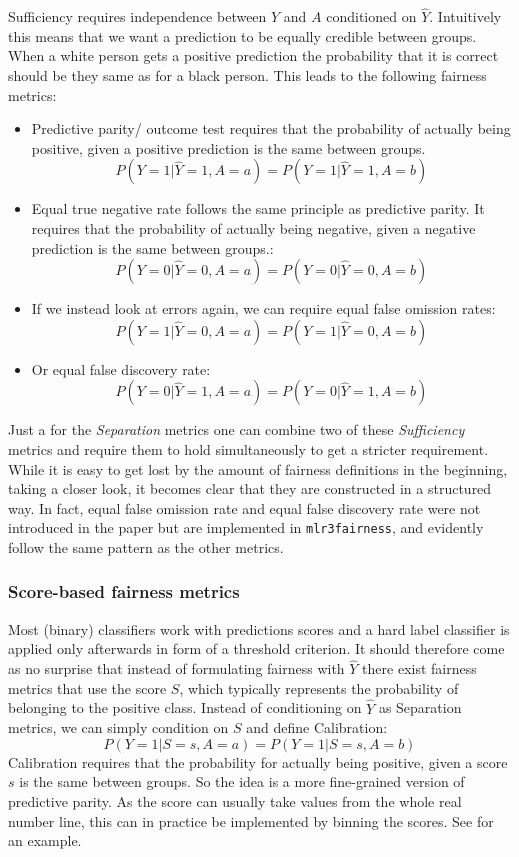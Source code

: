 Sufficiency requires independence between $Y$ and $A$ conditioned on $\hat{Y}$. Intuitively this means that we want a prediction to be equally credible between groups. When a white person gets a positive prediction the probability that it is correct should be they same as for a black person. This leads to the following fairness metrics:
\begin{itemize}
    \item Predictive parity/ outcome test requires that the probability of actually being positive, given a positive prediction is the same between groups. $$P(Y = 1 | \hat{Y} = 1, A = a) = P(Y = 1 | \hat{Y} = 1, A = b)$$
    \item Equal true negative rate follows the same principle as predictive parity. It requires that the probability of actually being negative, given a negative prediction is the same between groups.: $$P(Y = 0 | \hat{Y} = 0, A = a) = P(Y = 0 | \hat{Y} = 0, A = b)$$
    \item If we instead look at errors again, we can require equal false omission rates: $$P(Y = 1 | \hat{Y} = 0, A = a) = P(Y = 1 | \hat{Y} = 0, A = b)$$
    \item Or equal false discovery rate: $$P(Y = 0 | \hat{Y} = 1, A = a) = P(Y = 0 | \hat{Y} = 1, A = b)$$
\end{itemize}

Just a for the \textit{Separation} metrics one can combine two of these  \textit{Sufficiency} metrics and require them to hold simultaneously to get a stricter requirement.
While it is easy to get lost by the amount of fairness definitions in the beginning, taking a closer look, it becomes clear that they are constructed in a structured way. In fact, equal false omission rate and equal false discovery rate were not introduced in the paper \cite{verma2018} but are implemented in \texttt{mlr3fairness}, and evidently follow the same pattern as the other metrics.

\subsubsection*{Score-based fairness metrics}
Most (binary) classifiers work with predictions scores and a hard label classifier is applied only afterwards in form of a threshold criterion. It should therefore come as no surprise that instead of formulating fairness with $\hat{Y}$ there exist fairness metrics that use the score $S$, which typically represents the probability of belonging to the positive class. Instead of conditioning on $\hat{Y}$ as Separation metrics, we can simply condition on $S$ and define Calibration:
$$P(Y = 1 | S = s, A = a) = P(Y = 1 | S = s, A = b)$$
Calibration requires that the probability for actually being positive, given a score $s$ is the same between groups. So the idea is a more fine-grained version of predictive parity. As the score can usually take values from the whole real number line, this can in practice be implemented by binning the scores. See \cite{verma2018} for an example.


